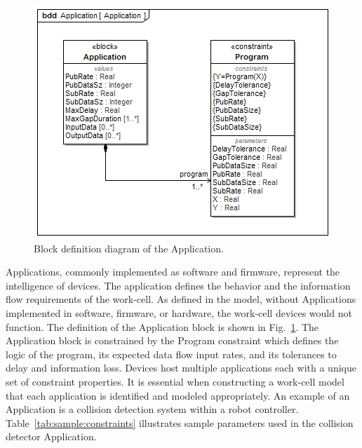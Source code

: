 \documentclass[journal, twoside]{IEEEtran}
\begin{document}
	\begin{figure}[tbp]
		\includegraphics[width=\columnwidth]{diagrams/bdd__Application__Application}
		\caption{Block definition diagram of the Application.}
		\label{fig:application:bdd}
	\end{figure}
	
	Applications, commonly implemented as software and firmware, represent the intelligence of devices.  The application defines the behavior and the information flow requirements of the work-cell.  As defined in the model, without Applications implemented in software, firmware, or hardware, the work-cell devices would not function.  The definition of the Application block is shown in Fig.~\ref{fig:application:bdd}.  The Application block is constrained by the Program constraint which defines the logic of the program, its expected data flow input rates, and its tolerances to delay and information loss.  Devices host multiple applications each with a unique set of constraint properties.  It is essential when constructing a work-cell model that each application is identified and modeled appropriately.  An example of an Application is a collision detection system within a robot controller. Table~\ref{tab:sample:constraints} illustrates sample parameters used in the collision detector Application.
	
    
\end{document}
